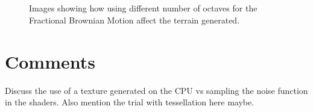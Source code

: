 \documentclass[12pt]{article}
\begin{document}
\begin{figure}
\centering     %
{}
\\
\\
\caption{Images showing how using different number of octaves for the Fractional Brownian Motion affect the terrain generated.}
\label{fig:octaves}
\end{figure}

\section{Comments}
Discuss the use of a texture generated on the CPU vs sampling the noise function in the shaders. Also mention the trial with tessellation here maybe.
\end{document}
